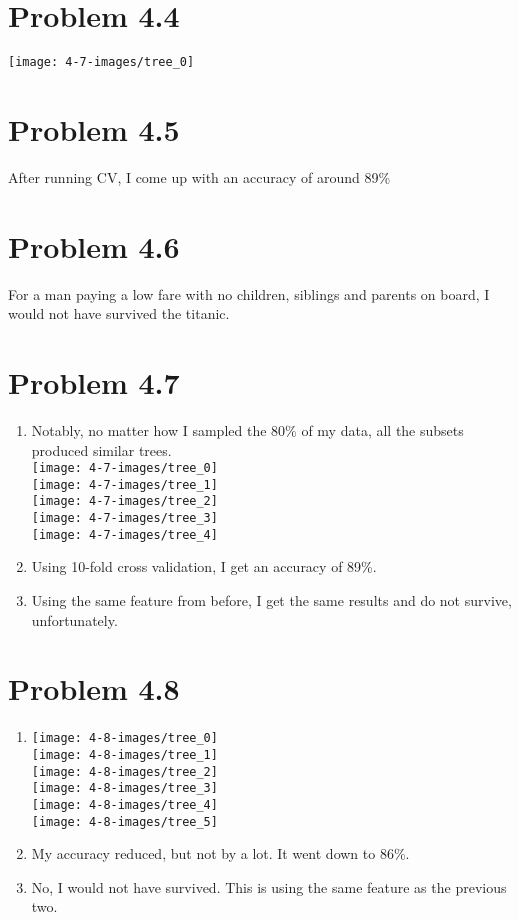 \documentclass{article}
\begin{document}
\section*{Problem 4.4}
\texttt{[image: 4-7-images/tree\_0]}

\section*{Problem 4.5}
After running CV, I come up with an accuracy of around 89\%

\section*{Problem 4.6}
For a man paying a low fare with no children, siblings and parents on board, I would not have survived the titanic.

\section*{Problem 4.7}
\begin{enumerate}[label=(\alph*)]
  \item Notably, no matter how I sampled the 80\% of my data, all the subsets produced similar trees. \\
  \texttt{[image: 4-7-images/tree\_0]} \\
  \texttt{[image: 4-7-images/tree\_1]} \\
  \texttt{[image: 4-7-images/tree\_2]} \\
  \texttt{[image: 4-7-images/tree\_3]} \\
  \texttt{[image: 4-7-images/tree\_4]}
  \item Using 10-fold cross validation, I get an accuracy of 89\%.
  \item Using the same feature from before, I get the same results and do not survive, unfortunately.
\end{enumerate}

\section*{Problem 4.8}
\begin{enumerate}[label=(\alph*)]
  \item
  \texttt{[image: 4-8-images/tree\_0]} \\
  \texttt{[image: 4-8-images/tree\_1]} \\
  \texttt{[image: 4-8-images/tree\_2]} \\
  \texttt{[image: 4-8-images/tree\_3]} \\
  \texttt{[image: 4-8-images/tree\_4]} \\
  \texttt{[image: 4-8-images/tree\_5]}
  \item My accuracy reduced, but not by a lot. It went down to 86\%.
  \item No, I would not have survived. This is using the same feature as the previous two.
\end{enumerate}
\end{document}
